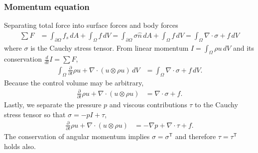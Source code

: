 \documentclass[letterpaper,11pt,nointlimits,reqno,draft]{amsart}
\newcommand{\trans}[1]{{#1}^{\ensuremath{\mathsf{T}}}}
\begin{document}
\subsubsection{Momentum equation}
Separating total force into surface forces and body forces
\begin{align}
  \sum{}F
  &=
     \int_{\partial\Omega} f_s \, dA
   + \int_{\Omega} f \, dV
  =
     \int_{\partial\Omega} \sigma \hat{n} \, dA
  +  \int_{\Omega} f \, dV
  =  \int_{\Omega} \nabla\cdot\sigma + f \, dV
\end{align}
where $\sigma$ is the Cauchy stress tensor.  From linear momentum
$I=\int_{\Omega} \rho{}u\,dV$ and its conservation $\frac{d}{dt}I=\sum{}F$,
\begin{align}
    \int_{\Omega}\frac{\partial{}}{\partial{}t}\rho{}u
  + \nabla\cdot(u\otimes{}\rho{}u)\,dV
&= \int_{\Omega} \nabla\cdot\sigma + f \, dV
.
\end{align}
Because the control volume may be arbitrary,
\begin{align}
  \frac{\partial{}}{\partial{}t}\rho{}u + \nabla\cdot(u\otimes{}\rho{}u)
&= \nabla\cdot\sigma + f
.
\end{align}
Lastly, we separate the pressure $p$ and viscous contributions $\tau$ to
the Cauchy stress tensor so that $\sigma = -p I + \tau$,
\begin{align}
\label{eq:cons_momentum}
\frac{\partial{}}{\partial{}t}\rho{}u + \nabla\cdot(u\otimes{}\rho{}u)
&= -\nabla{}p + \nabla\cdot{}\tau + f
.
\end{align}
The conservation of angular momentum implies $\sigma=\trans{\sigma}$ and
therefore $\tau=\trans{\tau}$ holds also.
\end{document}
